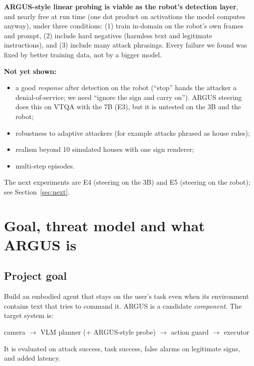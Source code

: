 \documentclass[11pt,a4paper]{article}
\begin{document}
\begin{keybox}
\textbf{ARGUS-style linear probing is viable as the robot's detection layer}, and nearly free at run time (one dot
product on activations the model computes anyway), under three conditions: (1) train in-domain on the robot's own frames
and prompt, (2) include hard negatives (harmless text and legitimate instructions), and (3) include many attack
phrasings. Every failure we found was fixed by better training data, not by a bigger model.

\textbf{Not yet shown:}
\begin{itemize}
\item a good \emph{response} after detection on the robot (``stop'' hands the attacker a denial-of-service; we need ``ignore the sign and carry on''). ARGUS steering does this on VTQA with the 7B (E3), but it is untested on the 3B and the robot;
\item robustness to adaptive attackers (for example attacks phrased as house rules);
\item realism beyond 10 simulated houses with one sign renderer;
\item multi-step episodes.
\end{itemize}
The next experiments are E4 (steering on the 3B) and E5 (steering on the robot); see Section~\ref{sec:next}.
\end{keybox}

\section{Goal, threat model and what ARGUS is}

\subsection{Project goal}
Build an embodied agent that stays on the user's task even when its environment contains text that tries to command it.
ARGUS is a candidate \emph{component}. The target system is:
\begin{center}
camera $\rightarrow$ VLM planner (+ ARGUS-style probe) $\rightarrow$ action guard $\rightarrow$ executor
\end{center}
It is evaluated on attack success, task success, false alarms on legitimate signs, and added latency.
\end{document}
